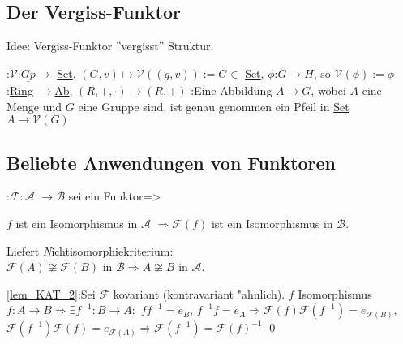 \subsection{Der Vergiss-Funktor}
Idee: Vergiss-Funktor ''vergisst'' Struktur.

\example{}:{$\mathcal{V}$:$\underline{Gp} \longrightarrow$ \underline{Set},
$(G,v)\mapsto \mathcal{V}((g,v)):= G \in$ \underline{Set},
$\phi$:$G \longrightarrow H$, so $\mathcal{V}(\phi):=\phi$
}
\example{}:{\underline{Ring} $ \longrightarrow$\underline{Ab},
$(R,+,\cdot) \longrightarrow (R,+)$
}
\remark{}:{Eine Abbildung $A \longrightarrow G$, wobei $A$ eine Menge und $G$ eine Gruppe
sind, ist genau genommen ein Pfeil in \underline{Set} $A \longrightarrow \mathcal{V}(G)$
 }
\subsection{Beliebte Anwendungen von Funktoren}
:{$\mathcal{F}:\mathcal{A}$
$\longrightarrow \mathcal{B}$ sei ein Funktor}=>{\label{lem_KAT_2}
$f$ ist ein Isomorphismus in $\mathcal{A}$
$\Rightarrow \mathcal{F}(f)$ ist ein Isomorphismus in $\mathcal{B}$.

Liefert {\emph Nichtisomorphiekriterium}: \\
$\mathcal{F}(A)\not\cong \mathcal{F}(B)$
in $\mathcal{B}\Rightarrow A\not\cong B$ in $\mathcal{A}$.}
\proof \ref{lem_KAT_2}:{Sei $\mathcal{F}$ kovariant (kontravariant "ahnlich). 
$f$ Isomorphismus $f:A\longrightarrow B \Rightarrow \exists f^{-1}:B\longrightarrow A:$
$ff^{-1}=e_B$, $f^{-1}f=e_A \Rightarrow \mathcal{F}(f)\mathcal{F}(f^{-1})=e_{\mathcal{F}(B)}$,
$\mathcal{F}(f^{-1})\mathcal{F}(f)=e_{\mathcal{F}(A)}\Rightarrow \mathcal{F}(f^{-1})=\mathcal{F}(f)^{-1}$
\qed
}
